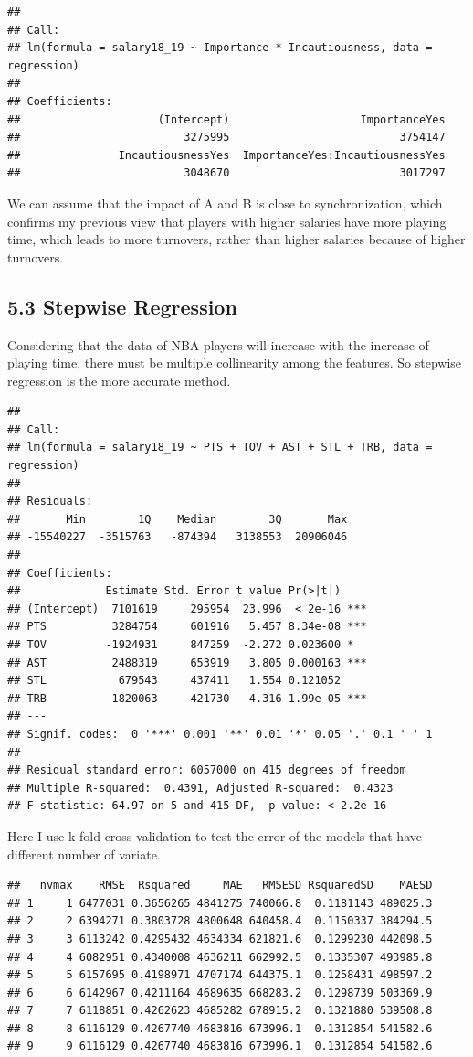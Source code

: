 \documentclass[]{article}
\begin{document}
\begin{verbatim}
## 
## Call:
## lm(formula = salary18_19 ~ Importance * Incautiousness, data = regression)
## 
## Coefficients:
##                     (Intercept)                    ImportanceYes  
##                         3275995                          3754147  
##               IncautiousnessYes  ImportanceYes:IncautiousnessYes  
##                         3048670                          3017297
\end{verbatim}

We can assume that the impact of A and B is close to synchronization,
which confirms my previous view that players with higher salaries have
more playing time, which leads to more turnovers, rather than higher
salaries because of higher turnovers.

\subsection{5.3 Stepwise Regression}\label{stepwise-regression}

Considering that the data of NBA players will increase with the increase
of playing time, there must be multiple collinearity among the features.
So stepwise regression is the more accurate method.

\begin{verbatim}
## 
## Call:
## lm(formula = salary18_19 ~ PTS + TOV + AST + STL + TRB, data = regression)
## 
## Residuals:
##       Min        1Q    Median        3Q       Max 
## -15540227  -3515763   -874394   3138553  20906046 
## 
## Coefficients:
##             Estimate Std. Error t value Pr(>|t|)    
## (Intercept)  7101619     295954  23.996  < 2e-16 ***
## PTS          3284754     601916   5.457 8.34e-08 ***
## TOV         -1924931     847259  -2.272 0.023600 *  
## AST          2488319     653919   3.805 0.000163 ***
## STL           679543     437411   1.554 0.121052    
## TRB          1820063     421730   4.316 1.99e-05 ***
## ---
## Signif. codes:  0 '***' 0.001 '**' 0.01 '*' 0.05 '.' 0.1 ' ' 1
## 
## Residual standard error: 6057000 on 415 degrees of freedom
## Multiple R-squared:  0.4391, Adjusted R-squared:  0.4323 
## F-statistic: 64.97 on 5 and 415 DF,  p-value: < 2.2e-16
\end{verbatim}

Here I use k-fold cross-validation to test the error of the models that
have different number of variate.

\begin{verbatim}
##   nvmax    RMSE  Rsquared     MAE   RMSESD RsquaredSD    MAESD
## 1     1 6477031 0.3656265 4841275 740066.8  0.1181143 489025.3
## 2     2 6394271 0.3803728 4800648 640458.4  0.1150337 384294.5
## 3     3 6113242 0.4295432 4634334 621821.6  0.1299230 442098.5
## 4     4 6082951 0.4340008 4636211 662992.5  0.1335307 493985.8
## 5     5 6157695 0.4198971 4707174 644375.1  0.1258431 498597.2
## 6     6 6142967 0.4211164 4689635 668283.2  0.1298739 503369.9
## 7     7 6118851 0.4262623 4685282 678915.2  0.1321880 539508.8
## 8     8 6116129 0.4267740 4683816 673996.1  0.1312854 541582.6
## 9     9 6116129 0.4267740 4683816 673996.1  0.1312854 541582.6
\end{verbatim}
\end{document}
